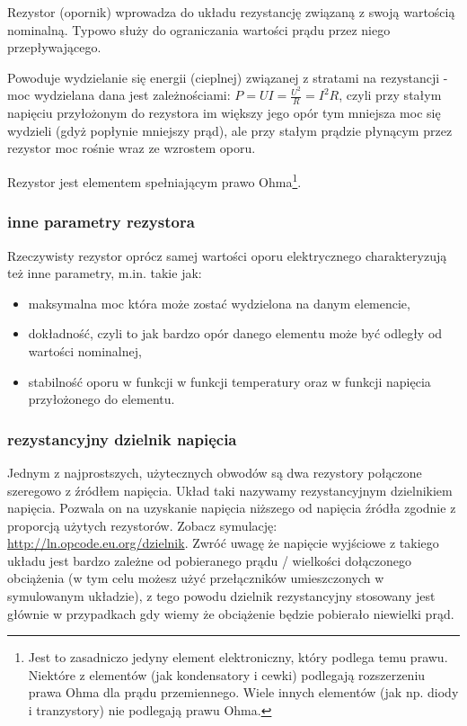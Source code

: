 Rezystor (opornik) wprowadza do układu rezystancję związaną z swoją wartością nominalną. Typowo służy do ograniczania wartości prądu przez niego przepływającego.

Powoduje wydzielanie się energii (cieplnej) związanej z stratami na rezystancji - moc wydzielana dana jest zależnościami: $P = UI = \frac{U^2}{R} = I^2R$, czyli przy stałym napięciu przyłożonym do rezystora im większy jego opór tym mniejsza moc się wydzieli (gdyż popłynie mniejszy prąd), ale przy stałym prądzie płynącym przez rezystor moc rośnie wraz ze wzrostem oporu.

Rezystor jest elementem spełniającym prawo Ohma\footnote{Jest to zasadniczo jedyny element elektroniczny, który podlega temu prawu. Niektóre z elementów (jak kondensatory i cewki) podlegają rozszerzeniu prawa Ohma dla prądu przemiennego. Wiele innych elementów (jak np. diody i tranzystory) nie podlegają prawu Ohma.}.

\subsubsection{inne parametry rezystora}
Rzeczywisty rezystor oprócz samej wartości oporu elektrycznego charakteryzują też inne parametry, m.in. takie jak:
\begin{itemize}
\item maksymalna moc która może zostać wydzielona na danym elemencie,
\item dokładność, czyli to jak bardzo opór danego elementu może być odległy od wartości nominalnej,
\item stabilność oporu w funkcji w funkcji temperatury oraz w funkcji napięcia przyłożonego do elementu.
\end{itemize}

\subsubsection{rezystancyjny dzielnik napięcia}\label{dzielnik}

Jednym z najprostszych, użytecznych obwodów są dwa rezystory połączone szeregowo z źródłem napięcia. Układ taki nazywamy rezystancyjnym dzielnikiem napięcia. Pozwala on na uzyskanie napięcia niższego od napięcia źródła zgodnie z proporcją użytych rezystorów. Zobacz symulację: \url{http://ln.opcode.eu.org/dzielnik}.
Zwróć uwagę że napięcie wyjściowe z takiego układu jest bardzo zależne od pobieranego prądu / wielkości dołączonego obciążenia (w tym celu możesz użyć przełączników umieszczonych w symulowanym układzie), z tego powodu dzielnik rezystancyjny stosowany jest głównie w przypadkach gdy wiemy że obciążenie będzie pobierało niewielki prąd.

